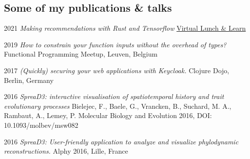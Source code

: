 \documentclass[a4paper, oneside, final]{scrartcl}
\newenvironment{lyxlist}[1]
{\begin{list}{}
{\settowidth{\labelwidth}{#1}
 \setlength{\leftmargin}{\labelwidth}
 \addtolength{\leftmargin}{\labelsep}
 \renewcommand{\makelabel}[1]{##1\hfil}}}
{\end{list}}
\newcommand{\noun}[1]{\textsc{#1}}
\begin{document}
\begin{center}
\section{Some of my publications \& talks}

\begin{lyxlist}{00.00.0000}

\item [{\noun{\scriptsize 2021}}] \emph{Making recommendations with Rust and Tensorflow }
\href{https://www.youtube.com/watch?v=RG4g0Wd_elo&t=1s}{Virtual Lunch \& Learn}

\item [{\noun{\scriptsize 2019}}] \emph{How to constrain your function inputs without the overhead of types? }
Functional Programming Meetup, Leuven, Belgium

\item [{\noun{\scriptsize 2017}}] \emph{(Quickly) securing your web applications with Keycloak. }
Clojure Dojo, Berlin, Germany


\item [{\noun{\scriptsize 2016}}] \emph{SpreaD3: interactive visualisation of spatiotemporal history and trait evolutionary processes}
Bielejec, F., Baele, G., Vrancken, B.,  Suchard, M. A., Rambaut, A., Lemey, P.
Molecular Biology and Evolution  2016, DOI: 10.1093/molbev/msw082


\item [{\noun{\scriptsize 2016}}] \emph{SpreaD3: User-friendly application to analyze and visualize phylodynamic reconstructions. }
Alphy 2016, Lille, France



\end{lyxlist}
\end{center}
\end{document}
